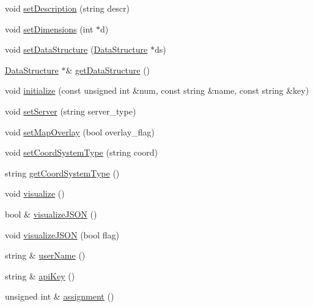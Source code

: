 \begin{DoxyCompactItemize}
\item 
void \mbox{\hyperlink{namespacebridges_1_1_bridges_ada1bced1a3d7af3b8b139bbdfba72fc8}{set\+Description}} (string descr)
\item 
void \mbox{\hyperlink{namespacebridges_1_1_bridges_a1eef7c2daeb3784169965f727bf4ad1b}{set\+Dimensions}} (int $\ast$d)
\item 
void \mbox{\hyperlink{namespacebridges_1_1_bridges_a7447e2d5808c492d26132690c1a639a7}{set\+Data\+Structure}} (\mbox{\hyperlink{classbridges_1_1_data_structure}{Data\+Structure}} $\ast$ds)
\item 
\mbox{\hyperlink{classbridges_1_1_data_structure}{Data\+Structure}} $\ast$\& \mbox{\hyperlink{namespacebridges_1_1_bridges_a7cee9c57a0cd6a213722ba0a81a742f0}{get\+Data\+Structure}} ()
\item 
void \mbox{\hyperlink{namespacebridges_1_1_bridges_a10272250ed6f4bb8281dcaecc61fa698}{initialize}} (const unsigned int \&num, const string \&name, const string \&key)
\item 
void \mbox{\hyperlink{namespacebridges_1_1_bridges_a569953bfdb1c2a29dbd0f7d6dee73606}{set\+Server}} (string server\+\_\+type)
\item 
void \mbox{\hyperlink{namespacebridges_1_1_bridges_a221442c674b625a403486076cf8a7c03}{set\+Map\+Overlay}} (bool overlay\+\_\+flag)
\item 
void \mbox{\hyperlink{namespacebridges_1_1_bridges_ad00c07d3a028110424909081a94c4013}{set\+Coord\+System\+Type}} (string coord)
\item 
string \mbox{\hyperlink{namespacebridges_1_1_bridges_a31f5db39ab9ce7df3e635eaaad1feb12}{get\+Coord\+System\+Type}} ()
\item 
void \mbox{\hyperlink{namespacebridges_1_1_bridges_a2806e395134614cdd6327400b53d28ad}{visualize}} ()
\item 
bool \& \mbox{\hyperlink{namespacebridges_1_1_bridges_a692124feb006d58c277db36c2e9342c8}{visualize\+J\+S\+ON}} ()
\item 
void \mbox{\hyperlink{namespacebridges_1_1_bridges_abb0f749a6dbcd0a430504f66de1dbe64}{visualize\+J\+S\+ON}} (bool flag)
\item 
string \& \mbox{\hyperlink{namespacebridges_1_1_bridges_a98c0c6658b8eb9e8f20a7f3119cbd984}{user\+Name}} ()
\item 
string \& \mbox{\hyperlink{namespacebridges_1_1_bridges_a4ec319d8c731624bd1aa0efa2427044e}{api\+Key}} ()
\item 
unsigned int \& \mbox{\hyperlink{namespacebridges_1_1_bridges_a97d6cfdc40ecead5d802ac2054933038}{assignment}} ()
\end{DoxyCompactItemize}


